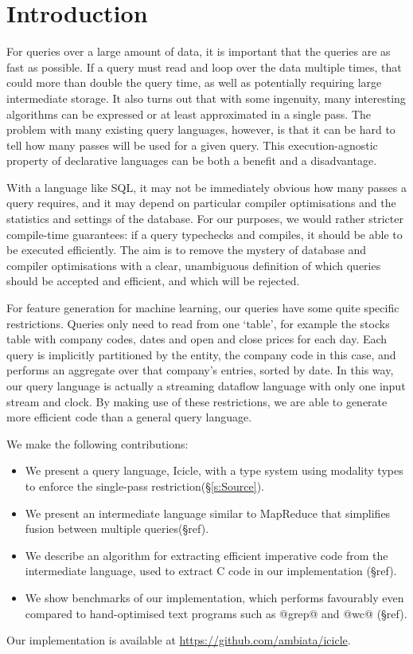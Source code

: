 \section{Introduction}
\label{s:Introduction}

For queries over a large amount of data, it is important that the queries are as fast as possible.
If a query must read and loop over the data multiple times, that could more than double the query time, as well as potentially requiring large intermediate storage.
It also turns out that with some ingenuity, many interesting algorithms can be expressed or at least approximated in a single pass.
The problem with many existing query languages, however, is that it can be hard to tell how many passes will be used for a given query.
This execution-agnostic property of declarative languages can be both a benefit and a disadvantage.

With a language like SQL, it may not be immediately obvious how many passes a query requires, and it may depend on particular compiler optimisations and the statistics and settings of the database.
For our purposes, we would rather stricter compile-time guarantees: if a query typechecks and compiles, it should be able to be executed efficiently.
The aim is to remove the mystery of database and compiler optimisations with a clear, unambiguous definition of which queries should be accepted and efficient, and which will be rejected.

For feature generation for machine learning, our queries have some quite specific restrictions.
Queries only need to read from one `table', for example the stocks table with company codes, dates and open and close prices for each day.
Each query is implicitly partitioned by the entity, the company code in this case, and performs an aggregate over that company's entries, sorted by date.
In this way, our query language is actually a streaming dataflow language with only one input stream and clock.
By making use of these restrictions, we are able to generate more efficient code than a general query language.

We make the following contributions:
\begin{itemize}
\item 
We present a query language, Icicle, with a type system using modality types to enforce the single-pass restriction(\S\ref{s:Source}).
\item
We present an intermediate language similar to MapReduce that simplifies fusion between multiple queries(\S ref).
\item
We describe an algorithm for extracting efficient imperative code from the intermediate language, used to extract C code in our implementation (\S ref).
\item
We show benchmarks of our implementation, which performs favourably even compared to hand-optimised text programs such as @grep@ and @wc@ (\S ref).
\end{itemize}

Our implementation is available at \url{https://github.com/ambiata/icicle}.

